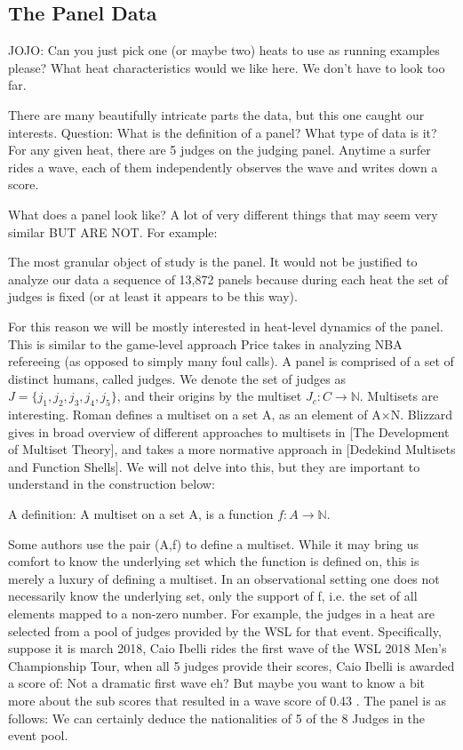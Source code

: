 \documentclass{article}
\theoremstyle{definition}
\begin{document}
\subsection{The Panel Data}
JOJO: Can you just pick one (or maybe two) heats to use as running examples please? What heat characteristics would we like here. We don't have to look too far.

There are many beautifully intricate parts the data, but this one caught our interests.
Question: What is the definition of a panel? What type of data is it?
For any given heat, there are 5 judges on the judging panel. Anytime a surfer rides a wave, each of them independently observes the wave and writes down a score. 

What does a panel look like? A lot of very different things that may seem very similar BUT ARE NOT. For example:

The most granular object of study is the panel. It would not be justified to analyze our data a sequence of 13,872 panels because during each heat the set of judges is fixed (or at least it appears to be this way).

For this reason we will be mostly interested in heat-level dynamics of the panel. This is similar to the game-level approach Price takes in analyzing NBA refereeing (as opposed to simply many foul calls). A panel is comprised of a set of distinct humans, called judges. We denote the set of judges as $J=\{j_1, j_2, j_3,j_4, j_5\}$, and their origins by the multiset $J_c:C\rightarrow\mathbb{N}$. Multisets are interesting. Roman defines a multiset on a set A, as an element of A×N. Blizzard gives in broad overview of different approaches to multisets in [The Development of Multiset Theory], and takes a more normative approach in [Dedekind Multisets and Function Shells]. We will not delve into this, but they are important to understand in the construction below:

A definition: A multiset on a set A, is a function $f:A\rightarrow\mathbb{N}$.

Some authors use the pair (A,f) to define a multiset. While it may bring us comfort to know the underlying set which the function is defined on, this is merely a luxury of defining a multiset. In an observational setting one does not necessarily know the underlying set, only the support of f, i.e. the set of all elements mapped to a non-zero number. For example, the judges in a heat are selected from a pool of judges provided by the WSL for that event. Specifically, suppose it is march 
2018, Caio Ibelli rides the first wave of the WSL 2018 Men's Championship Tour, when all 5 judges provide their scores, Caio Ibelli is awarded a score of:
Not a dramatic first wave eh? But maybe you want to know a bit more about the sub scores that resulted in a wave score of 0.43 . The panel is as follows:
We can certainly deduce the nationalities of 5 of the 8 Judges in the event pool.
\end{document}
